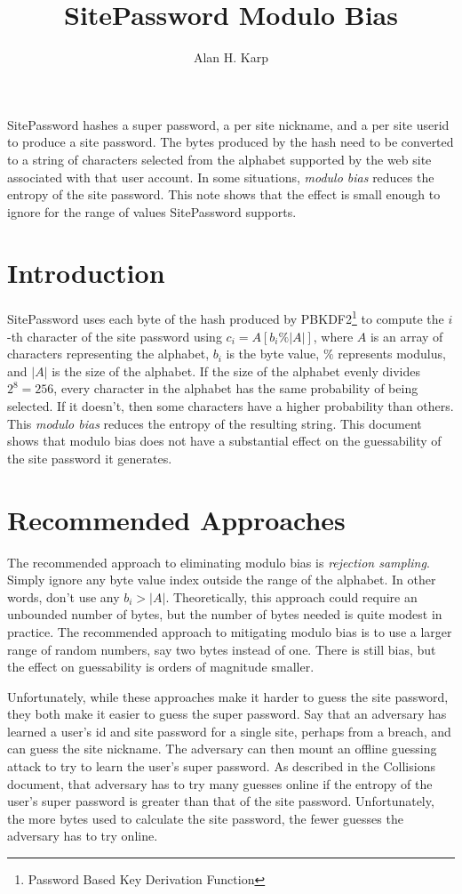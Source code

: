 \documentclass[11pt, oneside]{article}   	%
\title{SitePassword Modulo Bias}
\author{Alan H. Karp}
\begin{document}
\maketitle
\abstract

SitePassword hashes  a super password, a per site nickname, and a per site userid to produce a site password.  The bytes produced by the hash need to be converted to a string of characters selected from the alphabet supported by the web site associated with that user account.  In some situations, {\em modulo bias} reduces the entropy of the site password.  This note shows that the effect is small enough to ignore for the range of values SitePassword supports.

\section{Introduction}

SitePassword uses each byte of the hash produced by PBKDF2\footnote{Password Based Key Derivation Function} to compute the $i$-th character of the site password using $c_i = A[b_i\%|A|]$, where $A$ is an array of characters representing the alphabet, $b_i$ is the byte value, $\%$ represents modulus, and $|A|$ is the size of the alphabet.  If the size of the alphabet evenly divides $2^8 = 256$, every character in the alphabet has the same probability of being selected.  If it doesn't, then some characters have a higher probability than others.  This {\em modulo bias} reduces the entropy of the resulting string.  This document shows that modulo bias does not have a substantial effect on the guessability of the site password it generates.

\section{Recommended Approaches}

The recommended approach to eliminating modulo bias is {\em rejection sampling}.  Simply ignore any byte value index outside the range of the alphabet.  In other words, don't use any $b_i > |A|$.  Theoretically, this approach could require an unbounded number of bytes, but the number of bytes needed is quite modest in practice.  The recommended approach to mitigating modulo bias is to use a larger range of random numbers, say two bytes instead of one.  There is still bias, but the effect on guessability is orders of magnitude smaller.

Unfortunately, while these approaches make it harder to guess the site password, they both make it easier to guess the super password.  Say that an adversary has learned a user's id and site password for a single site, perhaps from a breach, and can guess the site nickname.  The adversary can then mount an offline guessing attack to try to learn the user's super password.  As described in the Collisions document, that adversary has to try many guesses online if the entropy of the user's super password is greater than that of the site password.  Unfortunately, the more bytes used to calculate the site password, the fewer guesses the adversary has to try online.
\end{document}
